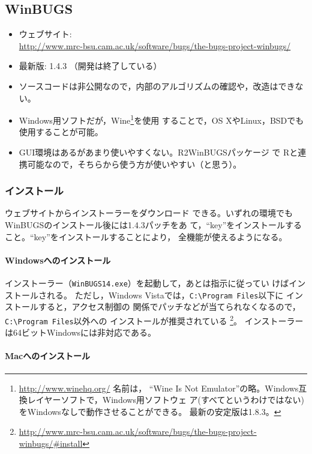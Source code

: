 \documentclass[11pt,uplatex]{jsarticle}
\begin{document}
\subsection{WinBUGS}

\begin{itemize}
\item ウェブサイト:\\
  \url{http://www.mrc-bsu.cam.ac.uk/software/bugs/the-bugs-project-winbugs/}
\item 最新版: 1.4.3 （開発は終了している）
\item ソースコードは非公開なので，内部のアルゴリズムの確認や，改造はできない。
\item Windows用ソフトだが，\textsf{Wine}\footnote{\url{http://www.winehq.org/} 名前は，
``Wine Is Not Emulator''の略。Windows互換レイヤーソフトで，Windows用ソフトウェ
  ア(すべてというわけではない)をWindowsなしで動作させることができる。
  最新の安定版は1.8.3。}を使用
  することで，OS XやLinux，BSDでも使用することが可能。
\item GUI環境はあるがあまり使いやすくない。\textsf{R2WinBUGS}パッケージ
  で \textsf{R}と連携可能なので，そちらから使う方が使いやすい（と思う）。
\end{itemize}

\subsubsection*{インストール}

ウェブサイトからインストーラーをダウンロード
できる。いずれの環境でも\textsf{WinBUGS}のインストール後には1.4.3パッチをあ
て，``key''をインストールすること。``key''をインストールすることにより，
全機能が使えるようになる。

\paragraph{Windowsへのインストール}

インストーラー（\texttt{WinBUGS14.exe}）を起動して，あとは指示に従ってい
けばインストールされる。
ただし，Windows Vistaでは，\texttt{C:{\textbackslash}Program~Files}以下に
インストールすると，アクセス制御の
関係でパッチなどが当てられなくなるので，\texttt{C:{\textbackslash}Program~Files}以外への
インストールが推奨されている
\footnote{\url{http://www.mrc-bsu.cam.ac.uk/software/bugs/the-bugs-project-winbugs/#install}}。
インストーラーは64ビットWindowsには非対応である。

\paragraph{Macへのインストール}
\end{document}
